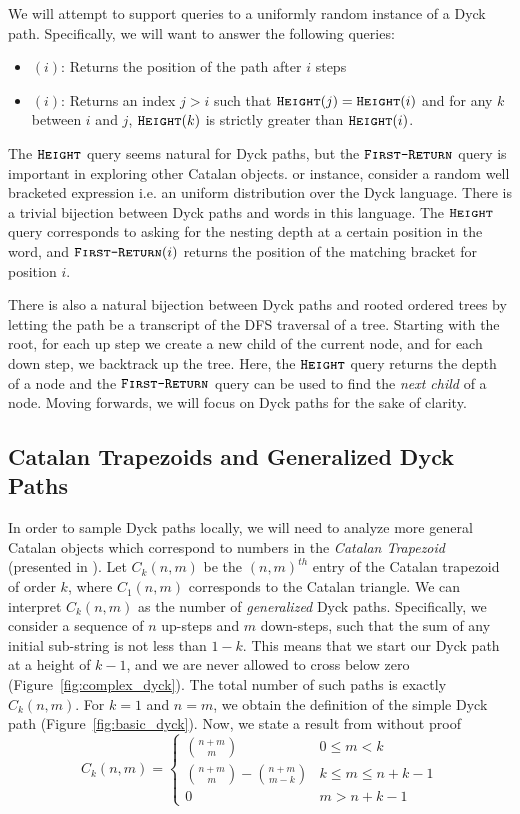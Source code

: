 We will attempt to support queries to a uniformly random instance of a Dyck path.
Specifically, we will want to answer the following queries:
\begin{itemize}
    \item {}$(i)$: Returns the position of the path after $i$ steps
    \item {}$(i)$: Returns an index $j>i$ such that $\texttt{\textsc{Height}}(j)=\texttt{\textsc{Height}}(i)$ and for any $k$ between $i$ and $j$,
    $\texttt{\textsc{Height}}(k)$ is strictly greater than $\texttt{\textsc{Height}}(i)$.
\end{itemize}
The $\texttt{\textsc{Height}}$ query seems natural for Dyck paths, but the $\texttt{\textsc{First-Return}}$ query is important in exploring other Catalan objects.
or instance, consider a random well bracketed expression i.e. an uniform distribution over the Dyck language.
There is a trivial bijection between Dyck paths and words in this language.
The $\texttt{\textsc{Height}}$ query corresponds to asking for the nesting depth at a certain position in the word,
and $\texttt{\textsc{First-Return}}(i)$ returns the position of the matching bracket for position $i$.

There is also a natural bijection between Dyck paths and rooted ordered trees by letting the path be a transcript of the DFS traversal of a tree.
Starting with the root, for each up step we create a new child of the current node, and for each down step, we backtrack up the tree.
Here, the $\texttt{\textsc{Height}}$ query returns the depth of a node and the $\texttt{\textsc{First-Return}}$ query can be used to find the \emph{next child} of a node.
Moving forwards, we will focus on Dyck paths for the sake of clarity.



\subsection{Catalan Trapezoids and Generalized Dyck Paths}
In order to sample Dyck paths locally, we will need to analyze more general Catalan objects
which correspond to numbers in the \textit{Catalan Trapezoid} (presented in \cite{trap}).
Let $C_k(n,m)$ be the $(n,m)^{th}$ entry of the Catalan trapezoid of order $k$, where $C_1(n,m)$ corresponds to the Catalan triangle.
We can interpret $C_k(n,m)$ as  the number of \emph{generalized} Dyck paths.
Specifically, we consider a sequence of $n$ up-steps and $m$ down-steps, such that the sum of any initial sub-string is not less than $1-k$.
This means that we start our Dyck path at a height of $k-1$, and we are never allowed to cross below zero (Figure~\ref{fig:complex_dyck}).
The total number of such paths is exactly $C_k(n,m)$.
For $k = 1$ and $n=m$, we obtain the definition of the simple Dyck path (Figure~\ref{fig:basic_dyck}).
Now, we state a result from \cite{trap} without proof
$$
C_k(n,m)=
\begin{cases}
{n+m}\choose m &0\le m<k\\
{{n+m}\choose{m}} - {{n+m}\choose{m-k}} &k\le m\le n+k-1\\
0 &m>n+k-1
\end{cases}
$$

